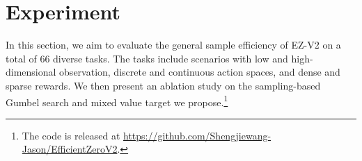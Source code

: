 

\section{Experiment}
In this section, we aim to evaluate the general sample efficiency of EZ-V2 on a total of 66 diverse tasks.
The tasks include scenarios with low and high-dimensional observation, discrete and continuous action spaces, and dense and sparse rewards. We then present an ablation study on the sampling-based Gumbel search and mixed value target we propose.\footnote{The code is released at \href{https://github.com/Shengjiewang-Jason/EfficientZeroV2}{https://github.com/Shengjiewang-Jason/EfficientZeroV2}.} 

